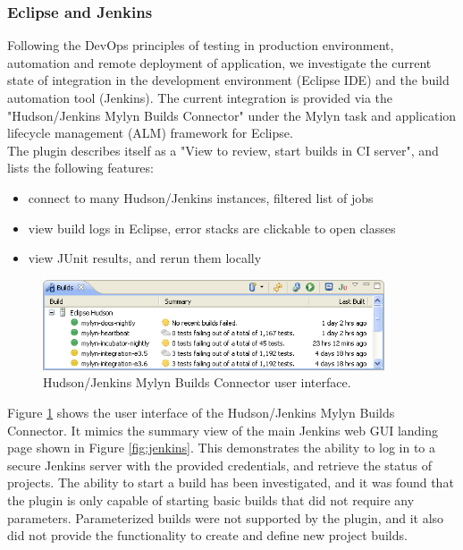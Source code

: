 \subsubsection{Eclipse and Jenkins}

Following the DevOps principles of testing in production environment, automation and remote deployment of application, we investigate the current state of integration in the development environment (Eclipse IDE) and the build automation tool (Jenkins). The current integration is provided via the "Hudson/Jenkins Mylyn Builds Connector" under the Mylyn task and application lifecycle management (ALM) framework for Eclipse. \cite{mylyn}\\
The plugin describes itself as a "View to review, start builds in CI server", and lists the following features:
\begin{itemize}
\item connect to many Hudson/Jenkins instances, filtered list of jobs
\item view build logs in Eclipse, error stacks are clickable to open classes
\item view JUnit results, and rerun them locally
\end{itemize}
\begin{figure}[h]
\centering
\caption{Hudson/Jenkins Mylyn Builds Connector user interface. \cite{mylyn}}
\label{fig:mylyn}
\includegraphics[width=0.9\textwidth]{images/mylyn.png}
\end{figure}
Figure \ref{fig:mylyn} shows the user interface of the Hudson/Jenkins Mylyn Builds Connector. It mimics the summary view of the main Jenkins web GUI landing page shown in Figure \ref{fig:jenkins}. This demonstrates the ability to log in to a secure Jenkins server with the provided credentials, and retrieve the status of projects. The ability to start a build has been investigated, and it was found that the plugin is only capable of starting basic builds that did not require any parameters. Parameterized builds were not supported by the plugin, and it also did not provide the functionality to create and define new project builds.

